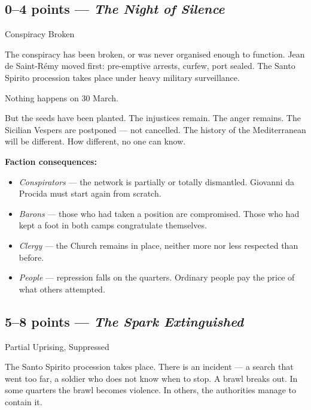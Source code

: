 \subsection{0--4 points --- \textit{The Night of Silence}}
\textcolor{oro}{\cinzel\large Conspiracy Broken}

\filetto

The conspiracy has been broken, or was never organised enough to
function. Jean de Saint-Rémy moved first: pre-emptive arrests, curfew,
port sealed. The Santo Spirito procession takes place under heavy
military surveillance.

Nothing happens on 30 March.

But the seeds have been planted. The injustices remain. The anger
remains. The Sicilian Vespers are postponed --- not cancelled.
The history of the Mediterranean will be different. How different,
no one can know.

\textbf{Faction consequences:}
\begin{itemize}[nosep]
  \item \textit{Conspirators} --- the network is partially or totally
    dismantled. Giovanni da Procida must start again from scratch.
  \item \textit{Barons} --- those who had taken a position are compromised.
    Those who had kept a foot in both camps congratulate themselves.
  \item \textit{Clergy} --- the Church remains in place, neither more
    nor less respected than before.
  \item \textit{People} --- repression falls on the quarters. Ordinary
    people pay the price of what others attempted.
\end{itemize}


\secsep

\subsection{5--8 points --- \textit{The Spark Extinguished}}
\textcolor{oro}{\cinzel\large Partial Uprising, Suppressed}

\filetto

The Santo Spirito procession takes place. There is an incident ---
a search that went too far, a soldier who does not know when to stop.
A brawl breaks out. In some quarters the brawl becomes violence. In
others, the authorities manage to contain it.

